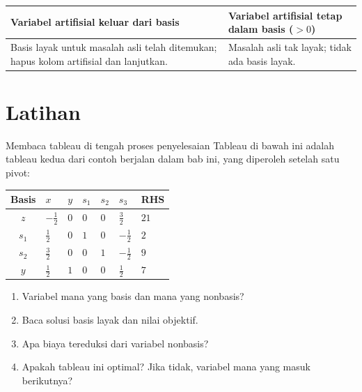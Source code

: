 \begin{center}
\renewcommand{\arraystretch}{1.3}
\begin{tabular}{@{}p{}p{}@{}}
\toprule
\textbf{Variabel artifisial keluar dari basis} & \textbf{Variabel artifisial tetap dalam basis ($>0$)}\\
\midrule
Basis layak untuk masalah asli telah ditemukan; hapus kolom artifisial dan lanjutkan. & Masalah asli tak layak; tidak ada basis layak. \\
\bottomrule
\end{tabular}
\par{}\label{tab:simplex-tableau-tab01}%

\end{center}

\section{Latihan}


\begin{ex}{Membaca tableau di tengah proses penyelesaian}{}
\label{ex:tableau-read-mid}
 Tableau di bawah ini adalah tableau kedua dari contoh berjalan dalam
bab ini, yang diperoleh setelah satu pivot:
\begin{center}
\renewcommand{\arraystretch}{1.3}
\begin{tabular}{c|ZZZZZ|Z}
\toprule
Basis & $x$ & $y$ & $s_1$ & $s_2$ & $s_3$ & RHS\\
\midrule
$z$   & $-\tfrac12$ & $0$ & $0$ & $0$ & $\tfrac32$ & $21$\\
\midrule
$s_1$ & $\tfrac12$ & $0$ & $1$ & $0$ & $-\tfrac12$ & $2$\\
$s_2$ & $\tfrac32$ & $0$ & $0$ & $1$ & $-\tfrac12$ & $9$\\
$y$   & $\tfrac12$ & $1$ & $0$ & $0$ & $\tfrac12$ & $7$\\
\bottomrule
\end{tabular}
\end{center}
\begin{enumerate}
\item Variabel mana yang basis dan mana yang nonbasis?
\item Baca solusi basis layak dan nilai objektif.
\item Apa biaya tereduksi dari variabel nonbasis?
\item Apakah tableau ini optimal? Jika tidak, variabel mana yang masuk berikutnya?
\end{enumerate}
\end{ex}

